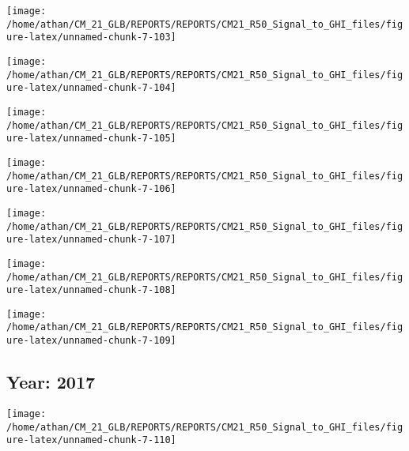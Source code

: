 \documentclass[
  11pt,
  a4paper,oneside]{article}
\begin{document}
\begin{center}\texttt{[image: /home/athan/CM\_21\_GLB/REPORTS/REPORTS/CM21\_R50\_Signal\_to\_GHI\_files/figure-latex/unnamed-chunk-7-103]} \end{center}

\begin{center}\texttt{[image: /home/athan/CM\_21\_GLB/REPORTS/REPORTS/CM21\_R50\_Signal\_to\_GHI\_files/figure-latex/unnamed-chunk-7-104]} \end{center}

\begin{center}\texttt{[image: /home/athan/CM\_21\_GLB/REPORTS/REPORTS/CM21\_R50\_Signal\_to\_GHI\_files/figure-latex/unnamed-chunk-7-105]} \end{center}

\begin{center}\texttt{[image: /home/athan/CM\_21\_GLB/REPORTS/REPORTS/CM21\_R50\_Signal\_to\_GHI\_files/figure-latex/unnamed-chunk-7-106]} \end{center}

\begin{center}\texttt{[image: /home/athan/CM\_21\_GLB/REPORTS/REPORTS/CM21\_R50\_Signal\_to\_GHI\_files/figure-latex/unnamed-chunk-7-107]} \end{center}

\begin{center}\texttt{[image: /home/athan/CM\_21\_GLB/REPORTS/REPORTS/CM21\_R50\_Signal\_to\_GHI\_files/figure-latex/unnamed-chunk-7-108]} \end{center}

\begin{center}\texttt{[image: /home/athan/CM\_21\_GLB/REPORTS/REPORTS/CM21\_R50\_Signal\_to\_GHI\_files/figure-latex/unnamed-chunk-7-109]} \end{center}

\FloatBarrier

\newpage

\hypertarget{year-2017}{%
\subsection{Year: 2017}\label{year-2017}}

\begin{center}\texttt{[image: /home/athan/CM\_21\_GLB/REPORTS/REPORTS/CM21\_R50\_Signal\_to\_GHI\_files/figure-latex/unnamed-chunk-7-110]} \end{center}
\end{document}
